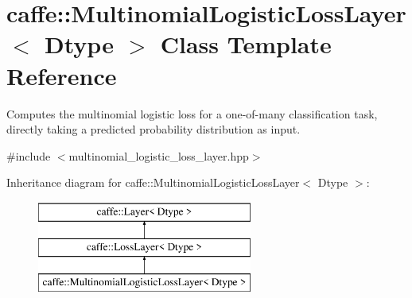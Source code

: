 \hypertarget{classcaffe_1_1MultinomialLogisticLossLayer}{}\section{caffe\+:\+:Multinomial\+Logistic\+Loss\+Layer$<$ Dtype $>$ Class Template Reference}
\label{classcaffe_1_1MultinomialLogisticLossLayer}


Computes the multinomial logistic loss for a one-\/of-\/many classification task, directly taking a predicted probability distribution as input.  




{\ttfamily \#include $<$multinomial\+\_\+logistic\+\_\+loss\+\_\+layer.\+hpp$>$}

Inheritance diagram for caffe\+:\+:Multinomial\+Logistic\+Loss\+Layer$<$ Dtype $>$\+:\begin{figure}[H]
\begin{center}
\leavevmode
\includegraphics[height=3.000000cm]{classcaffe_1_1MultinomialLogisticLossLayer}
\end{center}
\end{figure}
